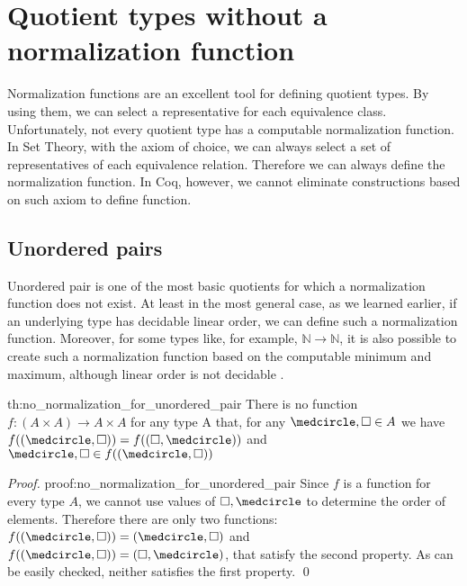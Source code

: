 \section{Quotient types without a normalization function}
Normalization functions are an excellent tool for defining quotient types. By using them, we can select a representative for each equivalence class. Unfortunately, not every quotient type has a computable normalization function. In Set Theory, with the axiom of choice, we can always select a set of representatives of each equivalence relation. Therefore we can always define the normalization function. In Coq, however, we cannot eliminate constructions based on such axiom to define function. 

\subsection{Unordered pairs}
Unordered pair is one of the most basic quotients for which a normalization function does not exist. At least in the most general case, as we learned earlier, if an underlying type has decidable linear order, we can define such a normalization function. Moreover, for some types like, for example, $\mathbb{N} \rightarrow \mathbb{N}$, it is also possible to create such a normalization function based on the computable minimum and maximum, although linear order is not decidable \cite{DefinableQuotients}.

\begin{theo}{}{th:no_normalization_for_unordered_pair}
There is no function $f: (A \times A) \rightarrow A \times A$ for any type A that, for any $\medcircle , \square \in A$ we have $f((\medcircle , \square)) = f((\square, \medcircle))$ and $\medcircle , \square \in f((\medcircle , \square))$ 
\end{theo}

\begin{proof}{}{proof:no_normalization_for_unordered_pair}
Since $f$ is a function for every type $A$, we cannot use values of $\square, \medcircle$ to determine the order of elements. Therefore there are only two functions: $f((\medcircle , \square)) = (\medcircle , \square)$ and $f((\medcircle , \square)) = (\square , \medcircle)$, that satisfy the second property. As can be easily checked, neither satisfies the first property. \qed
\end{proof}


